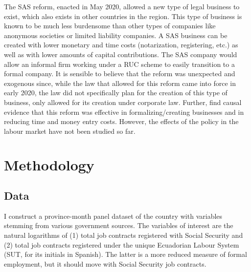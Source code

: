\documentclass[11pt,a4paper]{article}\usepackage[]{graphicx}\usepackage[]{xcolor}
\begin{document}
The SAS reform, enacted in May 2020, allowed a new type of legal business to exist, which also exists in other countries in the region. This type of business is known to be much less burdensome than other types of companies like anonymous societies or limited liability companies. A SAS business can be created with lower monetary and time costs (notarization, registering, etc.) as well as with lower amounts of capital contributions. The SAS company would allow an informal firm working under a RUC scheme to easily transition to a formal company. It is sensible to believe that the reform was unexpected and exogenous since, while the law that allowed for this reform came into force in early 2020, the law did not specifically plan for the creation of this type of business, only allowed for its creation under corporate law. Further, \textcite{CaminoMogro.2022} find causal evidence that this reform was effective in formalizing/creating businesses and in reducing time and money entry costs. However, the effects of the policy in the labour market have not been studied so far. 

\section{Methodology}
\subsection{Data}
I construct a province-month panel dataset of the country with variables stemming from various government sources. The variables of interest are the natural logarithms of (1) total job contracts registered with Social Security and (2) total job contracts registered under the unique Ecuadorian Labour System (SUT, for its initials in Spanish). The latter is a more reduced measure of formal employment, but it should move with Social Security job contracts.
\end{document}
